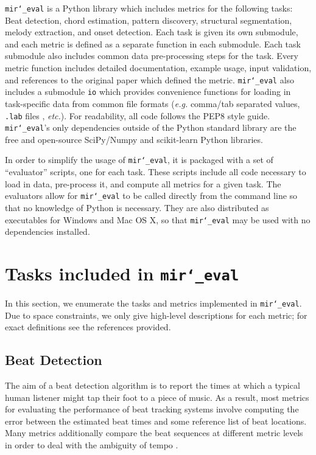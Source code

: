 \documentclass{article}
\def\eg{\emph{e.g.}}
\def\etc{\emph{etc.}}
\def\mireval{\texttt{mir\char`_eval}}
\begin{document}
\mireval{} is a Python library which includes metrics for the following tasks: Beat detection, chord estimation, pattern discovery, structural segmentation, melody extraction, and onset detection.
Each task is given its own submodule, and each metric is defined as a separate function in each submodule.
Each task submodule also includes common data pre-processing steps for the task.
Every metric function includes detailed documentation, example usage, input validation, and references to the original paper which defined the metric.
\mireval{} also includes a submodule \texttt{io} which provides convenience functions for loading in task-specific data from common file formats (\eg{} comma/tab separated values, \texttt{.lab} files \cite{harte2010towards}, \etc{}).
For readability, all code follows the PEP8 style guide\cite{van2001pep}.
\mireval{}'s only dependencies outside of the Python standard library are the free and open-source SciPy/Numpy\cite{jones2001scipy} and scikit-learn\cite{pedregosa2011scikit} Python libraries.

In order to simplify the usage of \mireval{}, it is packaged with a set of ``evaluator'' scripts, one for each task.
These scripts include all code necessary to load in data, pre-process it, and compute all metrics for a given task.
The evaluators allow for \mireval{} to be called directly from the command line so that no knowledge of Python is necessary.
They are also distributed as executables for Windows and Mac OS X, so that \mireval{} may be used with no dependencies installed.

\section{Tasks included in \mireval{}}
\label{sec:tasks}

In this section, we enumerate the tasks and metrics implemented in \mireval{}.
Due to space constraints, we only give high-level descriptions for each metric; for exact definitions see the references provided.

\subsection{Beat Detection}

The aim of a beat detection algorithm is to report the times at which a typical human listener might tap their foot to a piece of music.
As a result, most metrics for evaluating the performance of beat tracking systems involve computing the error between the estimated beat times and some reference list of beat locations.
Many metrics additionally compare the beat sequences at different metric levels in order to deal with the ambiguity of tempo \cite{levy2011improving}.
\end{document}
